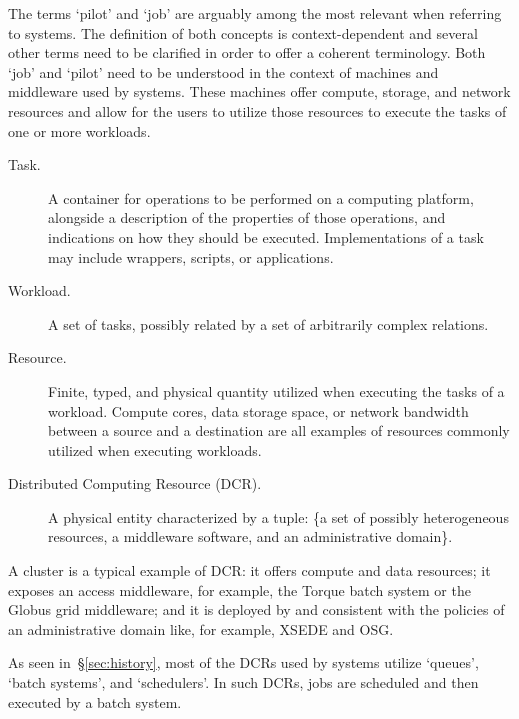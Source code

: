 \documentclass{sig-alternate}
\begin{document}
  The terms `pilot'
and `job' are arguably among the most relevant when referring to \pilotjob
systems.
The definition of both concepts is context-dependent and several other terms
need to be clarified in order to offer a coherent terminology. Both `job' and
`pilot' need to be understood in the context of machines and middleware used by
\pilotjob systems. These machines offer compute, storage, and network resources
and \pilots allow for the users to utilize those resources to execute the tasks
of one or more workloads.

\begin{description}

\item[Task.] A container for operations to be performed on a computing
platform, alongside a description of the properties of those operations, and
indications on how they should be executed. Implementations of a task may
include wrappers, scripts, or applications.

\item[Workload.] A set of tasks, possibly related by a set of arbitrarily
complex relations.

\item[Resource.] Finite, typed, and physical quantity utilized when executing
the tasks of a workload. Compute cores, data storage space, or network
bandwidth between a source and a destination are all examples of resources
commonly utilized when executing workloads.

\item[Distributed Computing Resource (DCR).] A physical entity characterized by
a tuple: \{a set of possibly heterogeneous resources, a middleware software, and
an administrative domain\}.

\end{description}

A cluster is a typical example of DCR: it offers compute and data resources; it
exposes an access middleware, for example, the Torque batch system or the Globus
grid middleware; and it is deployed by and consistent with the policies of an
administrative domain like, for example, XSEDE and OSG.

As seen in~\S\ref{sec:history}, most of the DCRs used by \pilotjob systems
utilize `queues', `batch systems', and `schedulers'. In such DCRs, jobs are
scheduled and then executed by a batch system.
\end{document}
